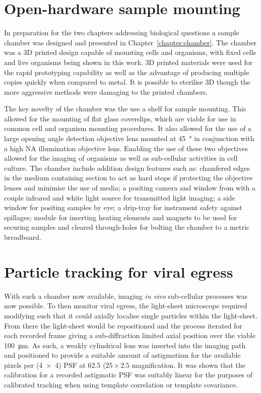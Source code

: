 \section{Open-hardware sample mounting}
In preparation for the two chapters addressing biological questions a sample chamber was designed and presented in Chapter~\ref{chapter:chamber}.
The chamber was a \gls{3D} printed design capable of mounting cells  and organisms, with fixed cells and live organisms being shown in this work.
\gls{3D} printed materials were used for the rapid prototyping capability as well as the advantage of producing multiple copies quickly when compared to metal.
It is possible to sterilise \gls{3D} though the more aggressive methods were damaging to the printed chambers.

The key novelty of the chamber was the use a shelf for sample mounting.
This allowed for the mounting of flat glass coverslips, which are viable for use in common cell and organism mounting procedures.
It also allowed for the use of a large opening angle detection objective lens mounted at \SI{45}{\degree} in conjunction with a high NA illumination objective lens.
Enabling the use of these two objectives allowed for the imaging of organisms as well as sub-cellular activities in cell culture.
The chamber include addition design features such as: chamfered edges in the medium containing section to act as hard stops if protecting the objective lenses and minimise the use of media; a positing camera and window from with a couple infrared and white light source for transmitted light imaging; a side window for positing samples by eye; a drip-tray for instrument safety against spillages; module for inserting heating elements and magnets to be used for securing samples and cleared through-holes for bolting the chamber to a metric breadboard.

\section{Particle tracking for viral egress}
With such a chamber now available, imaging \emph{in vivo} sub-cellular processes was now possible.
To then monitor viral egress, the light-sheet microscope required modifying such that it could axially localise single particles within the light-sheet.
From there the light-sheet would be repositioned and the process iterated for each recorded frame giving a sub-diffraction limited axial position over the viable \SI{100}{\micro\meter}.
As such, a weakly cylindrical lens was inserted into the imaging path and positioned to provide a suitable amount of astigmatism for the available pixels per (\SI{4x4}{}) \gls{PSF} at 62.5 (\(25\times2.5\) magnification.
It was shown that the calibration for a recorded astigmatic \gls{PSF} was suitably linear for the purposes of calibrated tracking when using template correlation or template covariance.

